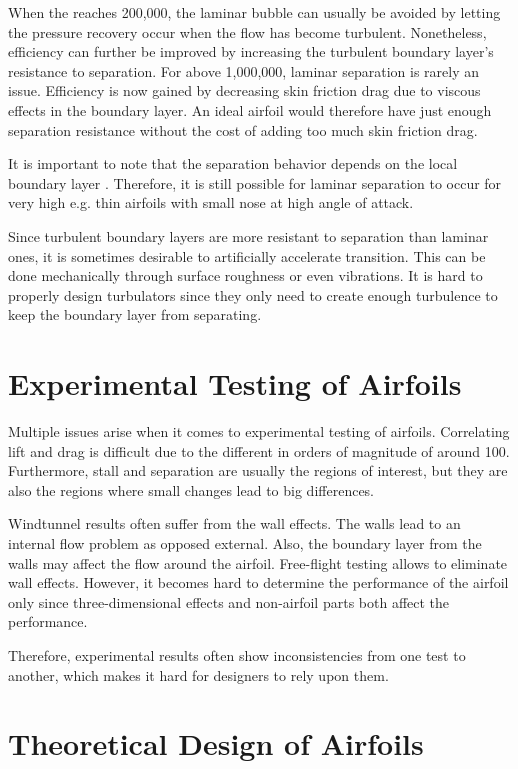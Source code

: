 \documentclass[letterpaper,12pt,]{article}
\begin{document}
When the \rn reaches 200,000, the laminar bubble can usually be avoided by letting the pressure recovery occur when the flow has become turbulent. Nonetheless, efficiency can further be improved by increasing the turbulent boundary layer's resistance to separation. For \rn above 1,000,000, laminar separation is rarely an issue. Efficiency is now gained by decreasing skin friction drag due to viscous effects in the boundary layer. An ideal airfoil would therefore have just enough separation resistance without the cost of adding too much skin friction drag.

It is important to note that the separation behavior depends on the local boundary layer \rn. Therefore, it is still possible for laminar separation to occur for very high \rn e.g. thin airfoils with small nose at high angle of attack.

Since turbulent boundary layers are more resistant to separation than laminar ones, it is sometimes desirable to artificially accelerate transition. This can be done mechanically through surface roughness or even vibrations. It is hard to properly design turbulators since they only need to create enough turbulence to keep the boundary layer from separating.

\section{Experimental Testing of Airfoils}

Multiple issues arise when it comes to experimental testing of airfoils. Correlating lift and drag is difficult due to the different in orders of magnitude of around 100. Furthermore, stall and separation are usually the regions of interest, but they are also the regions where small changes lead to big differences.

Windtunnel results often suffer from the wall effects. The walls lead to an internal flow problem as opposed external. Also, the boundary layer from the walls may affect the flow around the airfoil. Free-flight testing allows to eliminate wall effects. However, it becomes hard to determine the performance of the airfoil only since three-dimensional effects and non-airfoil parts both affect the performance.


Therefore, experimental results often show inconsistencies from one test to another, which makes it hard for designers to rely upon them.

\section{Theoretical Design of Airfoils}
\end{document}
